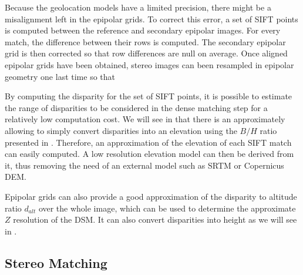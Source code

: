 Because the geolocation models have a limited precision, there might be a misalignment left in the epipolar grids. To correct this error, a set of SIFT points \cite{lowe_distinctive_2004} is computed between the reference and secondary epipolar images. For every match, the difference between their rows is computed. The secondary epipolar grid is then corrected so that row differences are null on average. Once aligned epipolar grids have been obtained, stereo images can been resampled in epipolar geometry one last time so that 

\begin{remark}
    By computing the disparity for the set of SIFT points, it is possible to estimate the range of disparities to be considered in the dense matching step for a relatively low computation cost. We will see in  that there is an approximately allowing to simply convert disparities into an elevation using the $B/H$ ratio presented in . Therefore, an approximation of the elevation of each SIFT match can easily computed. A low resolution elevation model can then be derived from it, thus removing the need of an external model such as SRTM or Copernicus DEM.
\end{remark} 

Epipolar grids can also provide a good approximation of the disparity to altitude ratio $d_{alt}$ over the whole image, which can be used to determine the approximate $Z$ resolution of the DSM. It can also convert disparities into height as we will see in . 

\subsection{Stereo Matching}\label{sec:stereo_matching}
